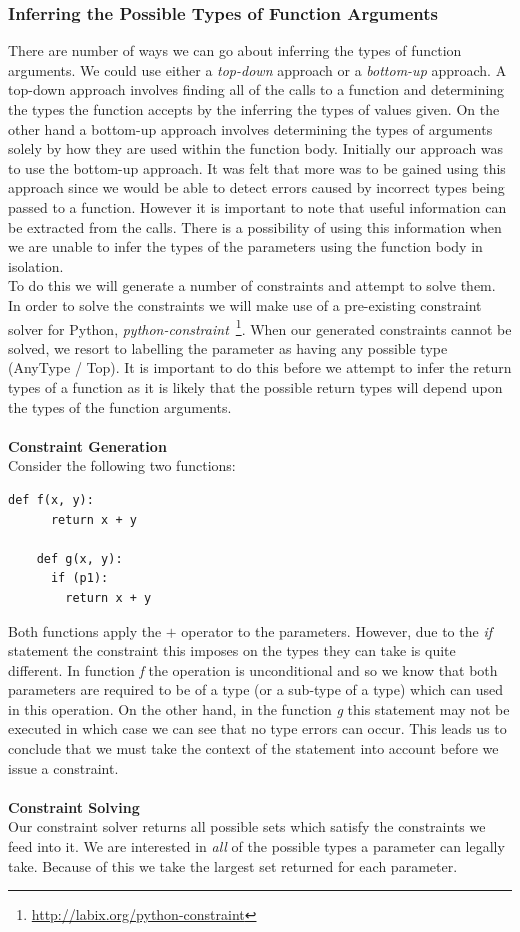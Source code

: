 \documentclass[12pt, titlepage]{article}
\begin{document}
\subsubsection{Inferring the Possible Types of Function Arguments}
There are number of ways we can go about inferring the types of function arguments. We could use either a \textit{top-down} approach or a \textit{bottom-up} approach. A top-down approach involves finding all of the calls to a function and determining the types the function accepts by the inferring the types of values given. On the other hand a bottom-up approach involves determining the types of arguments solely by how they are used within the function body. Initially our approach was to use the bottom-up approach. It was felt that more was to be gained using this approach since we would be able to detect errors caused by incorrect types being passed to a function. However it is important to note that useful information can be extracted from the calls. There is a possibility of using this information when we are unable to infer the types of the parameters using the function body in isolation. \\
To do this we will generate a number of constraints and attempt to solve them. In order to solve the constraints we will make use of a pre-existing constraint solver for Python, \textit{python-constraint}~\footnote{\url{http://labix.org/python-constraint}}. When our generated constraints cannot be solved, we resort to labelling the parameter as having any possible type (AnyType / Top).
It is important to do this before we attempt to infer the return types of a function as it is likely that the possible return types will depend upon the types of the function arguments. \\\\
\textbf{Constraint Generation} \\
Consider the following two functions:
\begin{lstlisting}[mathescape]
	def f(x, y):
	  return x + y
		
	def g(x, y):
	  if (p1):
	    return x + y
\end{lstlisting}
Both functions apply the $+$ operator to the parameters. However, due to the \textit{if} statement the constraint this imposes on the types they can take is quite different. In function \textit{f} the operation is unconditional and so we know that both parameters are required to be of a type (or a sub-type of a type) which can used in this operation. On the other hand, in the function \textit{g} this statement may not be executed in which case we can see that no type errors can occur. This leads us to conclude that we must take the context of the statement into account before we issue a constraint.
\\\\
\textbf{Constraint Solving} \\
Our constraint solver returns all possible sets which satisfy the constraints we feed into it. We are interested in \textit{all} of the possible types a parameter can legally take. Because of this we take the largest set returned for each parameter.
\end{document}
